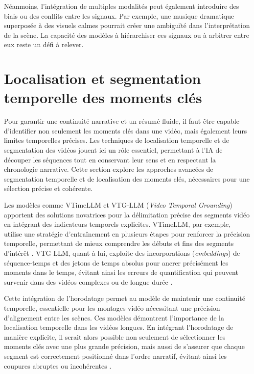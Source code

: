 Néanmoins, l’intégration de multiples modalités peut également introduire des biais ou des conflits entre les signaux. Par exemple, une musique dramatique superposée à des visuels calmes pourrait créer une ambiguïté dans l’interprétation de la scène. La capacité des modèles à hiérarchiser ces signaux ou à arbitrer entre eux reste un défi à relever.

\section{Localisation et segmentation temporelle des moments clés}

Pour garantir une continuité narrative et un résumé fluide, il faut être capable d’identifier non seulement les moments clés dans une vidéo, mais également leurs limites temporelles précises. Les techniques de localisation temporelle et de segmentation des vidéos jouent ici un rôle essentiel, permettant à l’IA de découper les séquences tout en conservant leur sens et en respectant la chronologie narrative. Cette section explore les approches avancées de segmentation temporelle et de localisation des moments clés, nécessaires pour une sélection précise et cohérente. 

Les modèles comme VTimeLLM \cite{huang2024_vtimellm} et VTG-LLM (\textit{Video Temporal Grounding}) \cite{guo2024_vtgllm} apportent des solutions novatrices pour la délimitation précise des segments vidéo en intégrant des indicateurs temporels explicites. VTimeLLM, par exemple, utilise une stratégie d’entraînement en plusieurs étapes pour renforcer la précision temporelle, permettant de mieux comprendre les débuts et fins des segments d’intérêt \cite{han2024_clip}\cite{lei2021_clipbert}. VTG-LLM, quant à lui, exploite des incorporations (\textit{embeddings}) de séquence-temps et des jetons de temps absolus pour ancrer précisément les moments dans le temps, évitant ainsi les erreurs de quantification qui peuvent survenir dans des vidéos complexes ou de longue durée \cite{guo2024_vtgllm}\cite{you2023_ferret}. 

Cette intégration de l’horodatage permet au modèle de maintenir une continuité temporelle, essentielle pour les montages vidéo nécessitant une précision d’alignement entre les scènes. Ces modèles démontrent l’importance de la localisation temporelle dans les vidéos longues. En intégrant l’horodatage de manière explicite, il serait alors possible non seulement de sélectionner les moments clés avec une plus grande précision, mais aussi de s’assurer que chaque segment est correctement positionné dans l’ordre narratif, évitant ainsi les coupures abruptes ou incohérentes \cite{lei2021_clipbert}\cite{anonymous2017_localizing}. 

